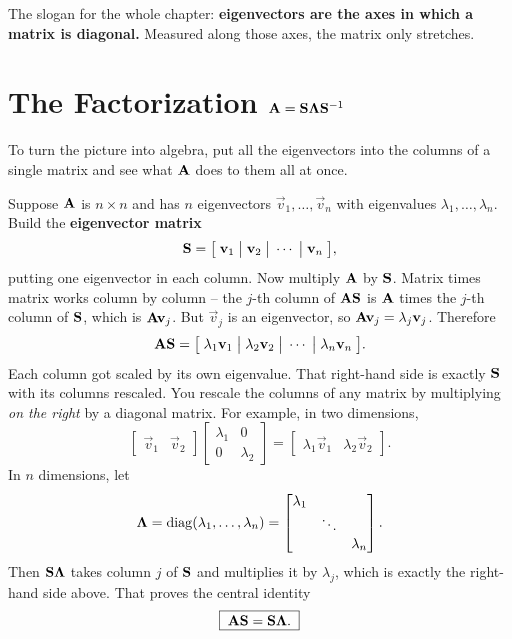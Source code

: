 \begin{focusbox}
The slogan for the whole chapter: \textbf{eigenvectors are the axes in which a
matrix is diagonal.} Measured along those axes, the matrix only stretches.
\end{focusbox}

\section{The Factorization \texorpdfstring{$\mathbf{A}=\mathbf{S}\mathbf{\Lambda}\mathbf{S}^{-1}$}{A = S Lambda S inverse}}
\label{ch24:factorization}

To turn the picture into algebra, put all the eigenvectors into the columns of
a single matrix and see what $\mathbf{A}$ does to them all at once.

Suppose $\mathbf{A}$ is $n\times n$ and has $n$ eigenvectors
$\vec{v}_1, \dots, \vec{v}_n$ with eigenvalues $\lambda_1, \dots, \lambda_n$.
Build the \textbf{eigenvector matrix}
\[
  \mathbf{S} = \big[\; \mathbf{v}_1 \;\big|\; \mathbf{v}_2 \;\big|\; \cdots \;\big|\; \mathbf{v}_n \;\big],
\]
putting one eigenvector in each column. Now multiply $\mathbf{A}$ by $\mathbf{S}$.
Matrix times matrix works column by column -- the $j$-th column of $\mathbf{A}\mathbf{S}$
is $\mathbf{A}$ times the $j$-th column of $\mathbf{S}$, which is $\mathbf{A}\mathbf{v}_j$.
But $\vec{v}_j$ is an eigenvector, so $\mathbf{A}\mathbf{v}_j = \lambda_j\mathbf{v}_j$.
Therefore
\[
  \mathbf{A}\mathbf{S}
  = \big[\; \lambda_1\mathbf{v}_1 \;\big|\; \lambda_2\mathbf{v}_2 \;\big|\; \cdots \;\big|\; \lambda_n\mathbf{v}_n \;\big].
\]
Each column got scaled by its own eigenvalue. That right-hand side is exactly
$\mathbf{S}$ with its columns rescaled. You rescale the columns of any matrix by
multiplying \emph{on the right} by a diagonal matrix. For example, in two dimensions,
\[
  \begin{bmatrix} \vec{v}_1 & \vec{v}_2 \end{bmatrix}
  \begin{bmatrix} \lambda_1 & 0 \\ 0 & \lambda_2 \end{bmatrix}
  = \begin{bmatrix} \lambda_1\vec{v}_1 & \lambda_2\vec{v}_2 \end{bmatrix}.
\]
In $n$ dimensions, let
\[
  \mathbf{\Lambda} = \operatorname{diag}(\lambda_1, \dots, \lambda_n)
  = \begin{bmatrix} \lambda_1 & & \\ & \ddots & \\ & & \lambda_n \end{bmatrix}.
\]
Then $\mathbf{S}\mathbf{\Lambda}$ takes column $j$ of $\mathbf{S}$ and multiplies it by
$\lambda_j$, which is exactly the right-hand side above. That proves the central
identity
\[
  \boxed{\;\mathbf{A}\mathbf{S} = \mathbf{S}\mathbf{\Lambda}.\;}
\]

